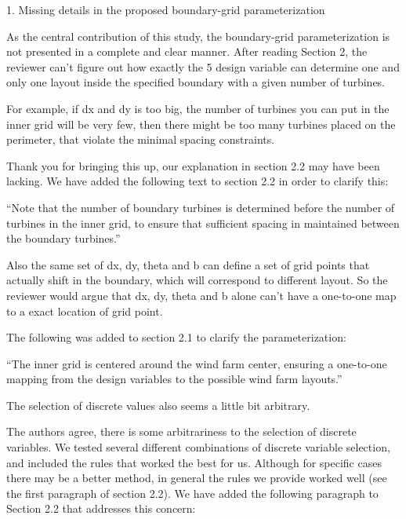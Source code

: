 \documentclass[12pt]{report}
\begin{document}
\bigskip

1. Missing details in the proposed boundary-grid parameterization 

As the central contribution of this study, the boundary-grid parameterization is not presented in a complete and clear manner. After reading Section 2, the reviewer can’t figure out how exactly the 5 design variable can determine one and only one layout inside the specified boundary with a given number of turbines. 

\bigskip
For example, if dx and dy is too big, the number of turbines you can put in the inner grid will be very few, then there might be too many turbines placed on the perimeter, that violate the minimal spacing constraints. 

\bigskip
\color{blue}

Thank you for bringing this up, our explanation in section 2.2 may have been lacking. We have added the following text to section 2.2 in order to clarify this:

\smallskip
``Note that the number of boundary turbines is determined before the number of turbines in the inner grid, to ensure that sufficient spacing in maintained between the boundary turbines.''

\color{black}
\bigskip 

Also the same set of dx, dy, theta and b can define a set of grid points that actually shift in the boundary, which will correspond to different layout. So the reviewer would argue that dx, dy, theta and b alone can’t have a one-to-one map to a exact location of grid point. 

\bigskip
\color{blue}

The following was added to section 2.1 to clarify the parameterization:
\smallskip

``The inner grid is centered around the wind farm center, ensuring a one-to-one mapping from the design variables to the possible wind farm layouts.''

\color{black}
\bigskip 

The selection of discrete values also seems a little bit arbitrary. 

\bigskip
\color{blue}

The authors agree, there is some arbitrariness to the selection of discrete variables. We tested several different combinations of discrete variable selection, and included the rules that worked the best for us. Although for specific cases there may be a better method, in general the rules we provide worked well (see the first paragraph of section 2.2). We have added the following paragraph to Section 2.2 that addresses this concern:
\end{document}
